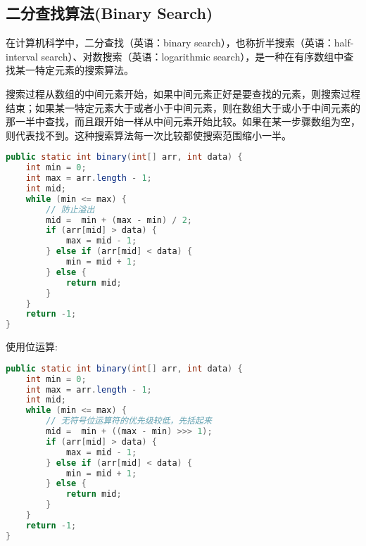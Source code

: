 \documentclass[../../../interview-questions.tex]{subfiles}
\begin{document}
\subsection{二分查找算法(Binary Search)}

在计算机科学中，二分查找（英语：binary search），也称折半搜索（英语：half-interval search）、对数搜索（英语：logarithmic search），是一种在有序数组中查找某一特定元素的搜索算法。

搜索过程从数组的中间元素开始，如果中间元素正好是要查找的元素，则搜索过程结束；如果某一特定元素大于或者小于中间元素，则在数组大于或小于中间元素的那一半中查找，而且跟开始一样从中间元素开始比较。如果在某一步骤数组为空，则代表找不到。这种搜索算法每一次比较都使搜索范围缩小一半。

\begin{lstlisting}[language=Java]
public static int binary(int[] arr, int data) {
    int min = 0;
    int max = arr.length - 1;
    int mid;
    while (min <= max) {
        // 防止溢出
        mid =  min + (max - min) / 2;
        if (arr[mid] > data) {
            max = mid - 1;
        } else if (arr[mid] < data) {
            min = mid + 1;
        } else {
            return mid;
        }
    }
    return -1;
}
\end{lstlisting}

使用位运算:

\begin{lstlisting}[language=Java]
public static int binary(int[] arr, int data) {
    int min = 0;
    int max = arr.length - 1;
    int mid;
    while (min <= max) {
        // 无符号位运算符的优先级较低，先括起来
        mid =  min + ((max - min) >>> 1);
        if (arr[mid] > data) {
            max = mid - 1;
        } else if (arr[mid] < data) {
            min = mid + 1;
        } else {
            return mid;
        }
    }
    return -1;
}
\end{lstlisting}
\end{document}
